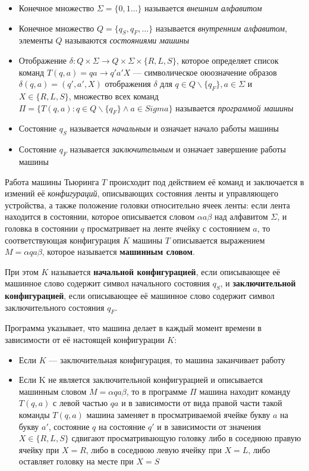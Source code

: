 \begin{itemize}
    \item Конечное множество $\Sigma=\{0,1\dots\}$ называется \textit{внешним алфавитом}
    \item Конечное множество $Q = \{q_S, q_F, \dots\}$ называется \textit{внутренним алфавитом}, элементы $Q$ называются \textit{состояниями машины}
    \item Отображение $\delta: Q \times \Sigma \to Q \times \Sigma \times \{R, L, S\}$, которое определяет список команд $T(q, a) = qa \to q'a'X$ --- символическое оюозначение образов $\delta(q, a) = (q', a', X)$ отображения $\delta$ для $q \in Q \backslash \{q_F\}, a \in \Sigma$ и $X \in \{R, L, S\}$, множество всех команд $\Pi = \{T(q, a): q \in Q \backslash \{q_F\} \land a \in Sigma\}$ называется \textit{программой машины}
    \item Состояние $q_S$ называется \textit{начальным} и означает начало работы машины
    \item Состояние $q_F$ называется \textit{заключительным} и означает завершение работы машины
\end{itemize}

Работа машины Тьюринга $T$ происходит под действием её команд и заключается в измений её \textit{конфигураций}, описывающих состояния ленты и управляющего устройства, а также положение головки относительно ячеек ленты: если лента находится в состоянии, которое описывается словом $\alpha a \beta$ над алфавитом $\Sigma$, и головка в состоянии $q$ просматривает на ленте ячейку с состоянием $a$, то соответствующая конфигурация $K$ машины $T$ описывается выражением $M=\alpha q a \beta$, которое называется \textbf{машинным словом}.

При этом $K$ называется \textbf{начальной конфигурацией}, если описывающее её машинное слово содержит символ начального состояния $q_S$, и \textbf{заключительной конфигурацией}, если описывающее её машинное слово содержит символ заключительного состояния $q_F$.

Программа указывает, что машина делает в каждый момент времени в зависимости от её настоящей конфигурации $K$:
\begin{itemize}
    \item Если $K$ --- заключительная конфигурация, то машина заканчивает работу
    \item Если K не является заключительной конфигурацией и описывается машинным словом $M=\alpha q a \beta$, то в программе $\Pi$ машина находит команду $T(q, a)$ с левой частью $qa$ и в зависимости от вида правой части такой команды $T(q,a)$ машина заменяет в просматриваемой ячейке букву $a$ на букву $a'$, состояние $q$ на состояние $q'$ и в зависимости от значения $X \in \{R, L, S\}$ сдвигают просматривающую головку либо в соседнюю правую ячейку при $X = R$, либо в соседнюю левую ячейку при $X = L$, либо оставляет головку на месте при $X = S$
\end{itemize}

